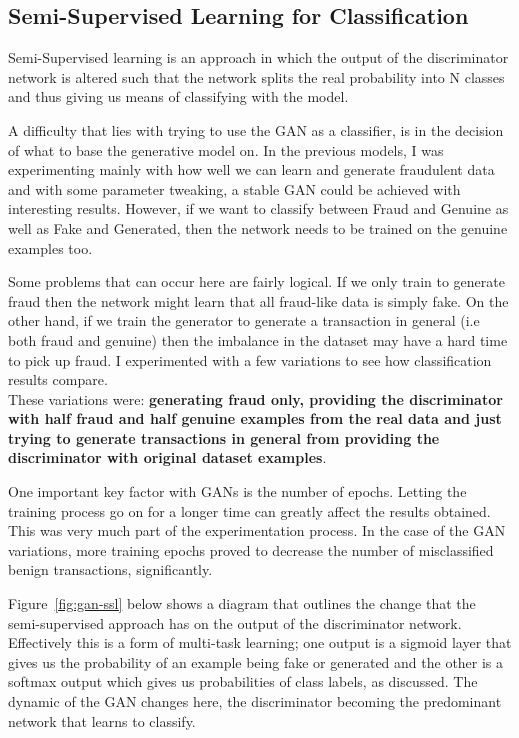 \documentclass[12pt,a4paper,twoside]{report}
\begin{document}
\subsection{Semi-Supervised Learning for Classification}

Semi-Supervised learning\cite{odena2016semi} is an approach in which the output of the discriminator network is altered such that the network splits the real probability into N classes and thus giving us means of classifying with the model. 

A difficulty that lies with trying to use the GAN as a classifier, is in the decision of what to base the generative model on. In the previous models, I was experimenting mainly with how well we can learn and generate fraudulent data and with some parameter tweaking, a stable GAN could be achieved with interesting results. However, if we want to classify between Fraud and Genuine as well as Fake and Generated, then the network needs to be trained on the genuine examples too. 

Some problems that can occur here are fairly logical. If we only train to generate fraud then the network might learn that all fraud-like data is simply fake. On the other hand, if we train the generator to generate a transaction in general (i.e both fraud and genuine) then the imbalance in the dataset may have a hard time to pick up fraud. 
I experimented with a few variations to see how classification results compare. \\
These variations were: \textbf{generating fraud only, providing the discriminator with half fraud and half genuine examples from the real data and just trying to generate transactions in general from providing the discriminator with original dataset examples}.

One important key factor with GANs is the number of epochs. Letting the training process go on for a longer time can greatly affect the results obtained. This was very much part of the experimentation process. In the case of the GAN variations, more training epochs proved to decrease the number of misclassified benign transactions, significantly.

Figure~\ref{fig:gan-ssl} below shows a diagram that outlines the change that the semi-supervised approach has on the output of the discriminator network. Effectively this is a form of multi-task learning; one output is a sigmoid layer that gives us the probability of an example being fake or generated and the other is a softmax output which gives us probabilities of class labels, as discussed. The dynamic of the GAN changes here, the discriminator becoming the predominant network that learns to classify. 
\end{document}
